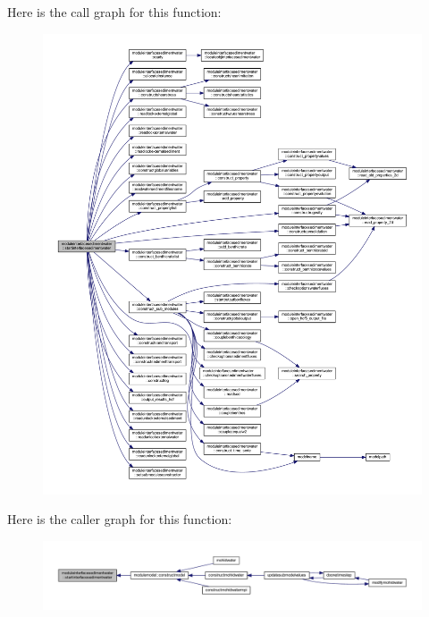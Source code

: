 Here is the call graph for this function\+:\nopagebreak
\begin{figure}[H]
\begin{center}
\leavevmode
\includegraphics[width=350pt]{namespacemoduleinterfacesedimentwater_ac4816996443451e1d6254c032bf000d5_cgraph}
\end{center}
\end{figure}
Here is the caller graph for this function\+:\nopagebreak
\begin{figure}[H]
\begin{center}
\leavevmode
\includegraphics[width=350pt]{namespacemoduleinterfacesedimentwater_ac4816996443451e1d6254c032bf000d5_icgraph}
\end{center}
\end{figure}
\mbox{\label{namespacemoduleinterfacesedimentwater_af7fed6c8828bf29ad2aadce486e94d62}} 
